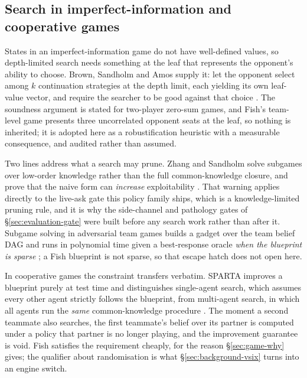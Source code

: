 \subsection{Search in imperfect-information and cooperative games}
\label{sec:related-search}

States in an imperfect-information game do not have well-defined values, so depth-limited search
needs something at the leaf that represents the opponent's ability to choose. Brown, Sandholm and
Amos supply it: let the opponent select among $k$ continuation strategies at the depth limit, each
yielding its own leaf-value vector, and require the searcher to be good against that choice
\cite{brown2018depthlimited}. The soundness argument is stated for two-player zero-sum games, and
Fish's team-level game presents three uncorrelated opponent seats at the leaf, so nothing is
inherited; it is adopted here as a robustification heuristic with a measurable consequence, and
audited rather than assumed.

Two lines address what a search may prune. Zhang and Sandholm solve subgames over low-order
knowledge rather than the full common-knowledge closure, and prove that the naive form can
\emph{increase} exploitability \cite{zhang2021subgamesolvingwithoutck}. That warning applies directly
to the live-ask gate this policy family ships, which is a knowledge-limited pruning rule, and it is
why the side-channel and pathology gates of \S\ref{sec:evaluation-gate} were built before any
search work rather than after it. Subgame solving in adversarial team games builds a gadget over the
team belief DAG and runs in polynomial time given a best-response oracle \emph{when the blueprint is
sparse} \cite{zhang2022teamsubgame}; a Fish blueprint is not sparse, so that escape hatch does not
open here.

In cooperative games the constraint transfers verbatim. SPARTA improves a blueprint purely at test
time and distinguishes single-agent search, which assumes every other agent strictly follows the
blueprint, from multi-agent search, in which all agents run the \emph{same} common-knowledge
procedure \cite{lerer2020sparta}. The moment a second teammate also searches, the first teammate's
belief over its partner is computed under a policy that partner is no longer playing, and the
improvement guarantee is void. Fish satisfies the requirement cheaply, for the reason
\S\ref{sec:game-why} gives; the qualifier about randomisation is what
\S\ref{sec:background-vsix} turns into an engine switch.

